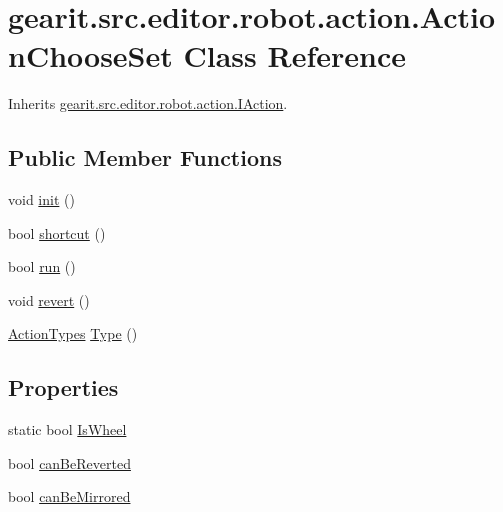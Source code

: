 \hypertarget{classgearit_1_1src_1_1editor_1_1robot_1_1action_1_1_action_choose_set}{\section{gearit.\+src.\+editor.\+robot.\+action.\+Action\+Choose\+Set Class Reference}
\label{classgearit_1_1src_1_1editor_1_1robot_1_1action_1_1_action_choose_set}
}


Inherits \hyperlink{interfacegearit_1_1src_1_1editor_1_1robot_1_1action_1_1_i_action}{gearit.\+src.\+editor.\+robot.\+action.\+I\+Action}.

\subsection*{Public Member Functions}
\begin{DoxyCompactItemize}
\item 
void \hyperlink{classgearit_1_1src_1_1editor_1_1robot_1_1action_1_1_action_choose_set_aef26ac9b10b5821cda07b3845cba3539}{init} ()
\item 
bool \hyperlink{classgearit_1_1src_1_1editor_1_1robot_1_1action_1_1_action_choose_set_a6719ff493d045857236dd13abb79f0e8}{shortcut} ()
\item 
bool \hyperlink{classgearit_1_1src_1_1editor_1_1robot_1_1action_1_1_action_choose_set_a716bb51cf66d3b722c174582ef05b526}{run} ()
\item 
void \hyperlink{classgearit_1_1src_1_1editor_1_1robot_1_1action_1_1_action_choose_set_a8771b1ddb665aa5e749bb2e4990514db}{revert} ()
\item 
\hyperlink{namespacegearit_1_1src_1_1editor_1_1robot_1_1action_a4be0fd46e3952d6135136b20e7b3fc5e}{Action\+Types} \hyperlink{classgearit_1_1src_1_1editor_1_1robot_1_1action_1_1_action_choose_set_a0d35af5cfb10114d60fdd4dac20e5036}{Type} ()
\end{DoxyCompactItemize}
\subsection*{Properties}
\begin{DoxyCompactItemize}
\item 
static bool \hyperlink{classgearit_1_1src_1_1editor_1_1robot_1_1action_1_1_action_choose_set_ab775c566eda157b051c2178ccd021e6e}{Is\+Wheel}
\item 
bool \hyperlink{classgearit_1_1src_1_1editor_1_1robot_1_1action_1_1_action_choose_set_a3eb64837f9f3d73381a25c5911951dc3}{can\+Be\+Reverted}
\item 
bool \hyperlink{classgearit_1_1src_1_1editor_1_1robot_1_1action_1_1_action_choose_set_adf987d057c0e48b08364409c8eacea99}{can\+Be\+Mirrored}
\end{DoxyCompactItemize}


